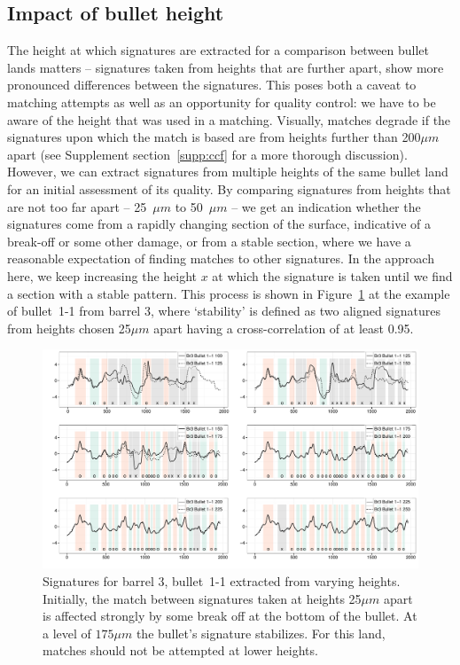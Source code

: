 \documentclass[aoas, preprint]{imsart}\usepackage[]{graphicx}\usepackage[]{color}
\newenvironment{knitrout}{}{} %
\begin{document}
\subsection{Impact of bullet height}\label{sec:heights}
The height at which signatures are extracted for a comparison between bullet lands matters -- signatures taken from heights that are further apart, show more pronounced differences between the signatures. 
This poses both a caveat to matching attempts as well as an opportunity for quality control: we have to be aware of the height that was used in a matching. Visually, matches degrade if the signatures upon which the match is based are from heights further than 200$\mu m$ apart  (see Supplement section~\ref{supp:ccf} for a more thorough discussion). However, we can extract signatures from multiple heights of the same bullet land for an initial assessment of its quality. By comparing signatures from heights that are not too far apart --  25~$\mu m$ to 50~$\mu m$ -- we get an indication whether the signatures come from a rapidly changing section of the surface, indicative of a break-off or some other damage, or from a stable section, where we have a reasonable expectation of finding matches to other signatures. In the approach here, we keep increasing the height $x$ at which the signature is taken until we find a section with a stable pattern. This process is shown in Figure~\ref{fig:crosscuts2} at the example of bullet~1-1 from barrel 3, where `stability' is  defined as two aligned signatures from heights chosen 25$\mu m$ apart having a cross-correlation of at least 0.95. 

\begin{figure}[hbtp]
  \centering
\begin{knitrout}
\color{fgcolor}
\includegraphics[width=\textwidth]{crosscuts-vary-b31-1} 

\end{knitrout}
\caption{\label{fig:crosscuts2}Signatures  for barrel 3, bullet~1-1 extracted from varying heights. Initially, the match between signatures taken at heights 25$\mu m$ apart is affected strongly by some break off at the bottom of the bullet. At a  level of $175\mu m$ the bullet's signature stabilizes. For this land, matches should not be attempted at lower heights. }
\end{figure}
\end{document}
